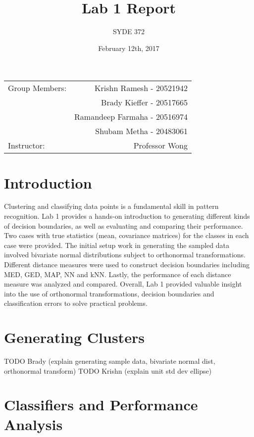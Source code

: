 \documentclass{article}
\title{Lab 1 Report} %
\author{SYDE 372} %
\date{February 12th, 2017} %
\begin{document}
\maketitle

\begin{center}
\begin{tabular}{l r}
Group Members: & Krishn Ramesh - 20521942 \\ %
& Brady Kieffer - 20517665 \\
& Ramandeep Farmaha - 20516974 \\
& Shubam Metha - 20483061\\
Instructor: & Professor Wong %
\end{tabular}
\end{center}



\section{Introduction}

Clustering and classifying data points is a fundamental skill in pattern recognition. Lab 1 provides a hands-on introduction to generating different kinds of decision boundaries, as well as evaluating and comparing their performance. Two cases with true statistics (mean, covariance matrices) for the classes in each case were provided. The initial setup work in generating the sampled data involved bivariate normal distributions subject to orthonormal transformations. Different distance measures were used to construct decision boundaries including MED, GED, MAP, NN and kNN. Lastly, the performance of each distance measure was analyzed and compared. Overall, Lab 1 provided valuable insight into the use of orthonormal transformations, decision boundaries and classification errors to solve practical problems.

\section{Generating Clusters}
TODO Brady (explain generating sample data, bivariate normal dist, orthonormal transform)
TODO Krishn (explain unit std dev ellipse)

\section{Classifiers and Performance Analysis}
\end{document}
